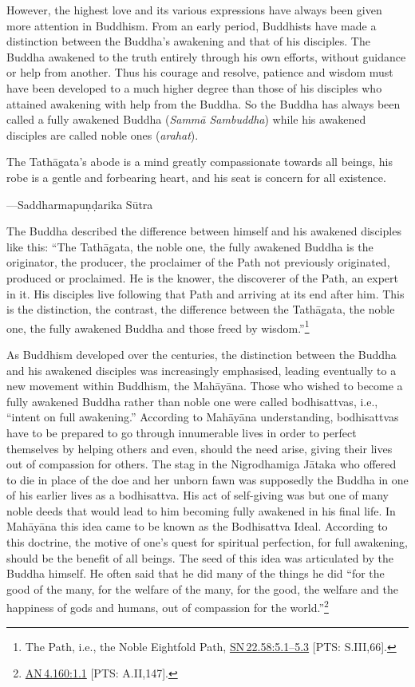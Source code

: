 \documentclass[10pt, openright]{book}
\newenvironment{epigram-2}%
{%
\vspace{1em}
\noindent
\quoting[leftmargin=2.5cm,rightmargin=2.5cm]%
\begin{itshape}
\large
}%
{\end{itshape}\endquoting
}%
\newenvironment{epigram-2-cite}%
{%
\quoting[leftmargin=2.5cm,rightmargin=2.5cm]%
\noindent\normal\hspace*{\fill} 
}%
{\endquoting\vspace{1em}
}%
\begin{document}
However, the highest love and its various expressions have always been given more attention in Buddhism. From an early period, Buddhists have made a distinction between the Buddha’s awakening and that of his disciples. The Buddha awakened to the truth entirely through his own efforts, without guidance or help from another. Thus his courage and resolve, patience and wisdom must have been developed to a much higher degree than those of his disciples who attained awakening with help from the Buddha. So the Buddha has always been called a fully awakened Buddha (\textit{Sammā Sambuddha}) while his awakened disciples are called noble ones (\textit{arahat}).


\begin{epigram-2}
The Tathāgata’s abode is a mind greatly compassionate towards all beings, his robe is a gentle and forbearing heart, and his seat is concern for all existence.
\end{epigram-2}

\begin{epigram-2-cite}
—Saddharmapuṇḍarika Sūtra
\end{epigram-2-cite}

The Buddha described the difference between himself and his awakened disciples like this: “The Tathāgata, the noble one, the fully awakened Buddha is the originator, the producer, the proclaimer of the Path not previously originated, produced or proclaimed. He is the knower, the discoverer of the Path, an expert in it. His disciples live following that Path and arriving at its end after him. This is the distinction, the contrast, the difference between the Tathāgata, the noble one, the fully awakened Buddha and those freed by wisdom.”\footnote {The Path, i.e., the Noble Eightfold Path, \href{https://suttacentral.net/sn22.58/en/sujato\#5.1}{SN 22.58:5.1–5.3} [PTS: S.III,66].}


As Buddhism developed over the centuries, the distinction between the Buddha and his awakened disciples was increasingly emphasised, leading eventually to a new movement within Buddhism, the Mahāyāna. Those who wished to become a fully awakened Buddha rather than noble one were called bodhisattvas, i.e., “intent on full awakening.” According to Mahāyāna understanding, bodhisattvas have to be prepared to go through innumerable lives in order to perfect themselves by helping others and even, should the need arise, giving their lives out of compassion for others. The stag in the Nigrodhamiga Jātaka who offered to die in place of the doe and her unborn fawn was supposedly the Buddha in one of his earlier lives as a bodhisattva. His act of self-giving was but one of many noble deeds that would lead to him becoming fully awakened in his final life. In Mahāyāna this idea came to be known as the Bodhisattva Ideal. According to this doctrine, the motive of one’s quest for spiritual perfection, for full awakening, should be the benefit of all beings. The seed of this idea was articulated by the Buddha himself. He often said that he did many of the things he did “for the good of the many, for the welfare of the many, for the good, the welfare and the happiness of gods and humans, out of compassion for the world.”\footnote {\href{https://suttacentral.net/an4.160/en/sujato\#1.1}{AN 4.160:1.1} [PTS: A.II,147].}
\end{document}
